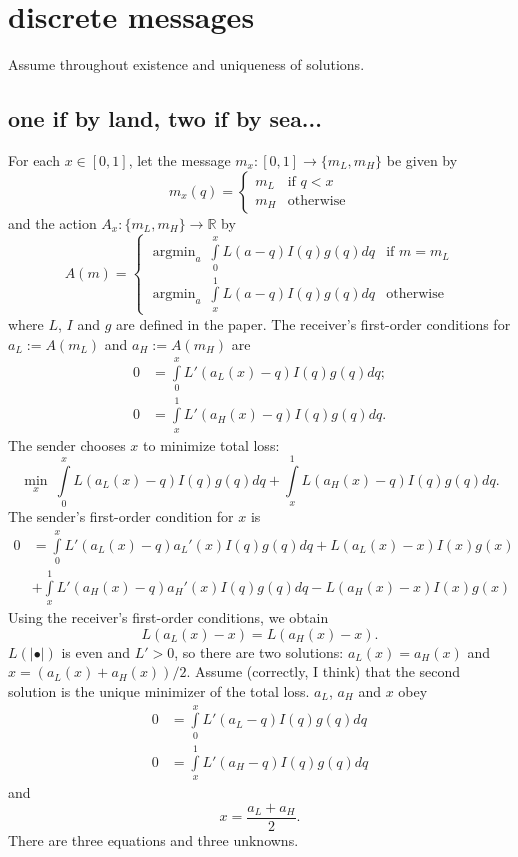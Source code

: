\documentclass[12pt]{article}
\DeclareMathOperator*{\argmin}{argmin}
\begin{document}
\section{discrete messages}
Assume throughout existence and uniqueness of solutions. 
\subsection{one if by land, two if by sea...}
\onehalfspacing
For each $x\in[0,1]$, let the message $m_{x}:[0,1]\rightarrow\{m_{L},m_{H}\}$ be given by
\begin{equation*}
m_{x}(q)=\left\{\begin{array}{ll}
m_{L} & \text{if } q<x \\
m_{H} & \text{otherwise}
\end{array}\right.
\end{equation*}
and the action $A_{x}:\{m_{L},m_{H}\}\rightarrow\mathbb{R}$ by
\begin{equation*}
A(m)=\left\{\begin{array}{ll}
\argmin_{a}\:\int\limits_{0}^{x}{L(a-q)I(q)g(q)dq} & \text{if } m=m_{L} \\
\argmin_{a}\:\int\limits_{x}^{1}{L(a-q)I(q)g(q)dq} & \text{otherwise}
\end{array}\right.
\end{equation*}
where $L$, $I$ and $g$ are defined in the paper. The receiver's first-order conditions for $a_{L}:=A(m_{L})$ and $a_{H}:=A(m_{H})$ are
\begin{align*}
0&=\int\limits_{0}^{x}{L'(a_{L}(x)-q)I(q)g(q)dq};\\
0&=\int\limits_{x}^{1}{L'(a_{H}(x)-q)I(q)g(q)dq}.
\end{align*}
The sender chooses $x$ to minimize total loss:
\begin{equation*}
\min_{x}\:\int\limits_{0}^{x}{L(a_{L}(x)-q)I(q)g(q)dq}+\int\limits_{x}^{1}{L(a_{H}(x)-q)I(q)g(q)dq}.
\end{equation*}
The sender's first-order condition for $x$ is
\begin{align*}
0&=\int\limits_{0}^{x}{L'(a_{L}(x)-q)a_{L}'(x)I(q)g(q)dq}+L(a_{L}(x)-x)I(x)g(x)\\
&+\int\limits_{x}^{1}{L'(a_{H}(x)-q)a_{H}'(x)I(q)g(q)dq}-L(a_{H}(x)-x)I(x)g(x)
\end{align*}
Using the receiver's first-order conditions, we obtain
\begin{equation*}
L(a_{L}(x)-x)=L(a_{H}(x)-x).
\end{equation*}
$L(|\bullet|)$ is even and $L'>0$, so there are two solutions: $a_{L}(x)=a_{H}(x)$ and $x=(a_{L}(x)+a_{H}(x))/2$. Assume (correctly, I think) that the second solution is the unique minimizer of the total loss. $a_L$, $a_{H}$ and $x$ obey
\begin{align*}
0&=\int\limits_{0}^{x}{L'(a_{L}-q)I(q)g(q)dq}\\
0&=\int\limits_{x}^{1}{L'(a_{H}-q)I(q)g(q)dq}
\end{align*}
and
\begin{equation*}
x=\frac{a_{L}+a_{H}}{2}.
\end{equation*}
There are three equations and three unknowns. 
\end{document}
